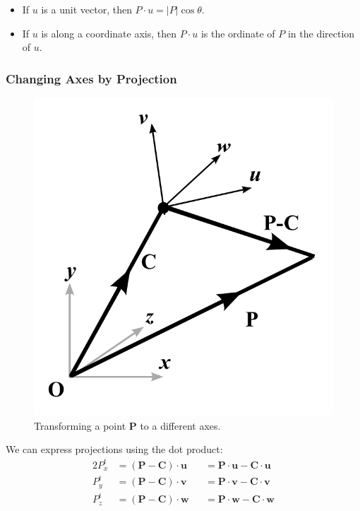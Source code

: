 \documentclass[11pt]{article}
\begin{document}
\begin{itemize}
  \item If $u$ is a unit vector, then $P \cdot u = \lvert P \rvert \cos \theta$.
  \item If $u$ is along a coordinate axis, then $P \cdot u$ is the ordinate of $P$ in the direction of $u$.
\end{itemize}

\subsubsection{Changing Axes by Projection}
\begin{figure}[htb!]
  \caption{Transforming a point $\textbf{P}$ to a different axes.}
  \includegraphics[scale=0.2]{changingaxes}
  \centering
\end{figure}

We can express projections using the dot product:
\begin{alignat*}{2}
  P_x^t &= (\textbf{P} - \textbf{C}) \cdot \textbf{u} &&= \textbf{P} \cdot \textbf{u} - \textbf{C} \cdot \textbf{u} \\
  P_y^t &= (\textbf{P} - \textbf{C}) \cdot \textbf{v} &&= \textbf{P} \cdot \textbf{v} - \textbf{C} \cdot \textbf{v} \\
  P_z^t &= (\textbf{P} - \textbf{C}) \cdot \textbf{w} &&= \textbf{P} \cdot \textbf{w} - \textbf{C} \cdot \textbf{w}
\end{alignat*}
\end{document}
